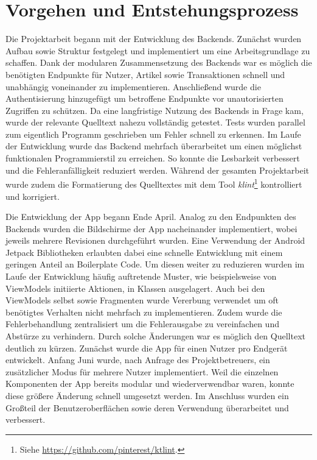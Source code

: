 \documentclass[a4paper, 11pt]{article}
\begin{document}
\section{Vorgehen und Entstehungsprozess}
\label{sec:methodologies}

Die Projektarbeit begann mit der Entwicklung des Backends.
Zunächst wurden Aufbau sowie Struktur festgelegt und implementiert um eine Arbeitsgrundlage zu schaffen.
Dank der modularen Zusammensetzung des Backends war es möglich die benötigten Endpunkte für Nutzer, Artikel sowie Transaktionen schnell und unabhängig voneinander zu implementieren.
Anschließend wurde die Authentisierung hinzugefügt um betroffene Endpunkte vor unautorisierten Zugriffen zu schützen.
Da eine langfristige Nutzung des Backends in Frage kam, wurde der relevante Quelltext nahezu vollständig getestet.
Tests wurden parallel zum eigentlich Programm geschrieben um Fehler schnell zu erkennen.
Im Laufe der Entwicklung wurde das Backend mehrfach überarbeitet um einen möglichst funktionalen Programmierstil zu erreichen.
So konnte die Lesbarkeit verbessert und die Fehleranfälligkeit reduziert werden.
Während der gesamten Projektarbeit wurde zudem die Formatierung des Quelltextes mit dem Tool \textit{klint}\footnote{Siehe \url{https://github.com/pinterest/ktlint}.} kontrolliert und korrigiert.

Die Entwicklung der App begann Ende April.
Analog zu den Endpunkten des Backends wurden die Bildschirme der App nacheinander implementiert, wobei jeweils mehrere Revisionen durchgeführt wurden.
Eine Verwendung der Android Jetpack Bibliotheken erlaubten dabei eine schnelle Entwicklung mit einem geringen Anteil an Boilerplate Code.
Um diesen weiter zu reduzieren wurden im Laufe der Entwicklung häufig auftretende Muster, wie beispielsweise von ViewModels initiierte Aktionen, in Klassen ausgelagert.
Auch bei den ViewModels selbst sowie Fragmenten wurde Vererbung verwendet um oft benötigtes Verhalten nicht mehrfach zu implementieren.
Zudem wurde die Fehlerbehandlung zentralisiert um die Fehlerausgabe zu vereinfachen und Abstürze zu verhindern.
Durch solche Änderungen war es möglich den Quelltext deutlich zu kürzen.
Zunächst wurde die App für einen Nutzer pro Endgerät entwickelt.
Anfang Juni wurde, nach Anfrage des Projektbetreuers, ein zusätzlicher Modus für mehrere Nutzer implementiert.
Weil die einzelnen Komponenten der App bereits modular und wiederverwendbar waren, konnte diese größere Änderung schnell umgesetzt werden. 
Im Anschluss wurden ein Großteil der Benutzeroberflächen sowie deren Verwendung überarbeitet und verbessert.
\end{document}
